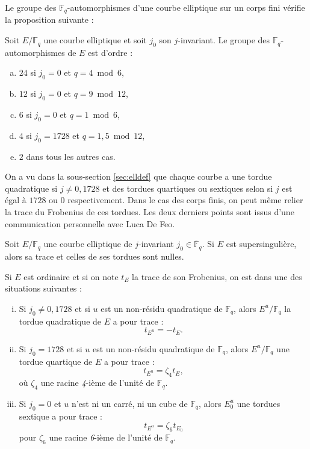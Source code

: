 \documentclass[a4paper]{article} %
\numberwithin{section}{part}
\numberwithin{equation}{section}
\newcommand\nroot[1]{\textit{#1}-ième}
\newcommand\GF[1]{\mathbb{F}_{#1}}
\begin{document}
\vspace{0.3cm}
Le groupe des $\GF{q}$-automorphismes d'une courbe elliptique sur un corps fini 
vérifie la proposition suivante :
\begin{prop}
\label{prop:autff}
Soit $E/\GF{q}$ une courbe elliptique et soit $j_0$ son $j$-invariant. Le groupe
des $\GF{q}$-automorphismes de $E$ est d'ordre :
\begin{enumerate}[(a)]
    \item $24$ si $j_0 = 0$ et $q = 4\bmod{6}$,
    \item $12$ si $j_0 = 0$ et $q = 9\bmod{12}$,
    \item $6$ si $j_0 = 0$ et $q = 1\bmod{6}$,
    \item $4$ si $j_0 = 1728$ et $q = 1, 5\bmod{12}$,
    \item $2$ dans tous les autres cas.
\end{enumerate}
\end{prop}
On a vu dans la sous-section \ref{sec:elldef} que chaque courbe a une tordue
quadratique si $j\neq0,1728$ et des tordues quartiques ou sextiques selon si $j$
est égal à $1728$ ou $0$ respectivement. Dans le cas des corps finis, on peut
même relier la trace du Frobenius de ces tordues. Les deux derniers points sont
issus d'une communication personnelle avec Luca De Feo.
\begin{prop}
\label{prop:trtwist}
Soit $E/\GF{q}$ une courbe elliptique de $j$-invariant 
$j_0\in\overline{\mathbb{F}}_q$. Si $E$ est supersingulière, alors sa trace et
celles de ses tordues sont nulles.\par
Si $E$ est ordinaire et si on note $t_E$ la trace de son Frobenius, on est dans
une des situations suivantes :
\begin{enumerate}[(i)]
\item Si $j_0\neq 0, 1728$ et si $u$ est un non-résidu quadratique de
$\GF{q}$, alors $E^u/\GF{q}$ la tordue quadratique de $E$ a pour trace :
\begin{equation}
t_{E^u} = -t_E.
\end{equation}

\item Si $j_0 = 1728$ et si $u$ est un non-résidu quadratique de
$\GF{q}$, alors $E^u/\GF{q}$ une tordue quartique de $E$ a pour trace :
\begin{equation}
t_{E^u} = \zeta_4t_{E},
\end{equation}
où $\zeta_4$ une racine \nroot{4} de l'unité de $\GF{q}$.\par

\item Si $j_0 = 0$ et $u$ n'est ni un carré, ni un cube de $\GF{q}$, alors  
$E_0^u$ une tordues sextique a pour trace :
\begin{equation}
t_{E^u} = \zeta_6t_{E_0}
\end{equation}
pour $\zeta_6$ une racine \nroot{6} de l'unité de $\GF{q}$.
\end{enumerate}
\end{prop}
\end{document}
